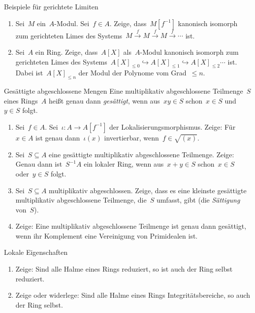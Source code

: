 \documentclass[entwurf]{uebblatt}
\begin{document}

\begin{aufgabe}{}{Beispiele für gerichtete Limiten}
\begin{enumerate}
\item Sei~$M$ ein~$A$-Modul. Sei~$f \in A$. Zeige, dass~$M[f^{-1}]$ kanonisch
isomorph zum gerichteten Limes des Systems~$M \xrightarrow{f} M \xrightarrow{f}
M \xrightarrow{f} \cdots$ ist.
\item Sei~$A$ ein Ring. Zeige, dass~$A[X]$ als~$A$-Modul kanonisch isomorph zum
gerichteten Limes des Systems~$A[X]_{\leq0} \hookrightarrow A[X]_{\leq1}
\hookrightarrow A[X]_{\leq2} \cdots$ ist. Dabei ist~$A[X]_{\leq n}$ der Modul
der Polynome vom Grad~$\leq n$.
\end{enumerate}
\end{aufgabe}

\begin{aufgabe}{}{Gesättigte abgeschlossene Mengen}
Eine multiplikativ abgeschlossene Teilmenge~$S$ eines Rings~$A$ heißt genau dann
\emph{gesättigt}, wenn aus~$xy \in S$ schon~$x \in S$ und~$y \in S$ folgt.
\begin{enumerate}
\item Sei~$f \in A$. Sei~$\iota : A \to A[f^{-1}]$ der
Lokalisierungsmorphismus. Zeige: Für~$x \in A$ ist genau dann~$\iota(x)$
invertierbar, wenn~$f \in \sqrt{(x)}$.
\item Sei~$S \subseteq A$ eine gesättigte multiplikativ abgeschlossene
Teilmenge. Zeige: Genau dann ist~$S^{-1}A$ ein lokaler Ring, wenn aus~$x + y
\in S$ schon~$x \in S$ oder~$y \in S$ folgt.
\item Sei~$S \subseteq A$ multiplikativ abgeschlossen.
Zeige, dass es eine kleinste gesättigte multiplikativ abgeschlossene Teilmenge,
die~$S$ umfasst, gibt (die \emph{Sättigung} von~$S$). 
\item Zeige: Eine multiplikativ abgeschlossene Teilmenge ist genau dann
gesättigt, wenn ihr Komplement eine Vereinigung von Primidealen ist.
\end{enumerate}
\end{aufgabe}

\begin{aufgabe}{}{Lokale Eigenschaften}
\begin{enumerate}
\item Zeige: Sind alle Halme eines Rings reduziert, so ist auch der Ring selbst
reduziert.
\item Zeige oder widerlege: Sind alle Halme eines Rings Integritätsbereiche, so
auch der Ring selbst.
\end{enumerate}
\end{aufgabe}
\end{document}
